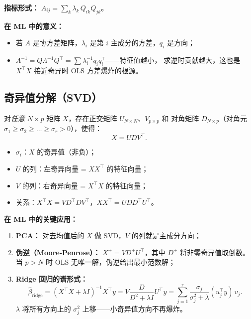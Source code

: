 \textbf{指标形式：} $A_{ij} = \sum_{k} \lambda_k \, Q_{ik} Q_{jk}$。

\textbf{在 ML 中的意义：}
\begin{itemize}
    \item 若 $A$ 是协方差矩阵，$\lambda_i$ 是第 $i$ 主成分的方差，$q_i$ 是方向；
    \item $A^{-1} = Q \Lambda^{-1} Q^\top = \sum \lambda_i^{-1} q_i q_i^\top$——特征值越小，
    求逆时贡献越大，这也是 $X^\top X$ 接近奇异时 OLS 方差爆炸的根源。
\end{itemize}

\subsection{奇异值分解（SVD）}

对\emph{任意} $N \times p$ 矩阵 $X$，存在正交矩阵 $U_{N \times N}$、$V_{p \times p}$ 和
对角矩阵 $D_{N \times p}$（对角元 $\sigma_1 \ge \sigma_2 \ge \dots \ge \sigma_r > 0$），使得：
\begin{equation}\label{eq:svd}
    X = U D V^\top.
\end{equation}

\begin{itemize}
    \item $\sigma_i$：$X$ 的奇异值（非负）；
    \item $U$ 的列：左奇异向量 = $X X^\top$ 的特征向量；
    \item $V$ 的列：右奇异向量 = $X^\top X$ 的特征向量；
    \item 关系：$X^\top X = V D^\top D V^\top$，$X X^\top = U D D^\top U^\top$。
\end{itemize}

\textbf{在 ML 中的关键应用：}
\begin{enumerate}[label=(\arabic*)]
    \item \textbf{PCA：} 对去均值后的 $X$ 做 SVD，$V$ 的列就是主成分方向；
    \item \textbf{伪逆（Moore-Penrose）：} $X^+ = V D^+ U^\top$，其中 $D^+$ 将非零奇异值取倒数。
    当 $p > N$ 时 OLS 无唯一解，伪逆给出最小范数解；
    \item \textbf{Ridge 回归的谱形式：}
    \begin{equation}
        \hat{\beta}_{\text{ridge}} = (X^\top X + \lambda I)^{-1} X^\top y
        = V \frac{D}{D^2 + \lambda I} U^\top y
        = \sum_{j=1}^{r} \frac{\sigma_j}{\sigma_j^2 + \lambda} (u_j^\top y) \, v_j.
    \end{equation}
    $\lambda$ 将所有方向上的 $\sigma_j^2$ 上移——小奇异值方向不再爆炸。
\end{enumerate}

